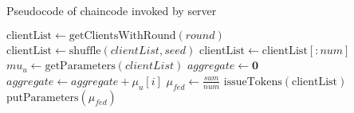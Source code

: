 \begin{algorithm}[h]
    \caption{Pseudocode of chaincode invoked by server}\label{alg:server}
    \begin{algorithmic}[1]
    \State $\text{clientList} \gets \text{getClientsWithRound}(round)$
    \State $\text{clientList} \gets \text{shuffle}(clientList, seed)$
    \State $\text{clientList} \gets \text{clientList}[:num]$
    \State $mu_u \gets \text{getParameters}(clientList)$
    \State $aggregate \gets \textbf{0}$
    \State $aggregate \gets aggregate + \mu_u[i]$
    \EndFor
    \State $\mu_{fed} \gets \frac{sum}{num}$
    \State $\text{issueTokens}(\text{clientList})$
    \State $\text{putParameters}(\mu_{fed})$
    \EndFunction
    \end{algorithmic}
\end{algorithm}
